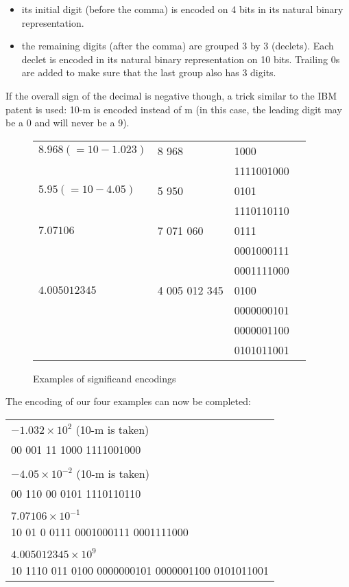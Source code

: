 \documentclass{acm_proc_article-sp}
\begin{document}
\begin{itemize}
\item its initial digit (before the comma) is encoded on 4 bits in its natural binary representation.
\item the remaining digits (after the comma) are grouped 3 by 3 (declets). Each declet is encoded in its natural binary representation on 10 bits. Trailing 0s are added to make sure that the last group also has 3 digits.
\end{itemize}

If the overall sign of the decimal is negative though, a trick similar to the IBM patent is used: 10-m is encoded instead of m (in this case, the leading digit may be a 0 and will never be a 9).

\begin{figure}
\caption{Examples of significand encodings}
\label{figure-significand-encoding}
\center
\begin{tabular}{|l|l|l|l}
\hline
$8.968 (=10-1.023)$ & 8 968 & 1000 \\
& & 1111001000 \\
\hline
$5.95 (=10-4.05)$ & 5 950 & 0101 \\
& & 1110110110\\
\hline
$7.07106$ & 7 071 060 & 0111 \\
& & 0001000111\\
& & 0001111000\\
\hline
$4.005012345$ & 4 005 012 345 & 0100 \\
& & 0000000101\\
& & 0000001100\\
& & 0101011001\\
\hline
\end{tabular}
\end{figure}

The encoding of our four examples can now be completed:

\begin{tabular}{l}
$- 1.032 \times 10^2$ (10-m is taken)\\
00 001 11 1000 1111001000\\
\\
$-4.05 \times 10^{-2}$ (10-m is taken)\\
00 110 00 0101 1110110110\\
\\
$7.07106 \times 10^{-1}$\\
10 01 0 0111 0001000111 0001111000\\
\\
$4.005012345 \times 10^9$\\
10 1110 011 0100 0000000101 0000001100 0101011001\\
\end{tabular}
\end{document}
